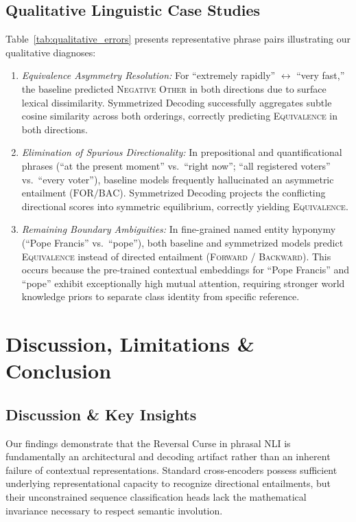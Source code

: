 \documentclass[11pt,a4paper,twocolumn]{article}
\begin{document}
\subsection{Qualitative Linguistic Case Studies}
Table~\ref{tab:qualitative_errors} presents representative phrase pairs illustrating our qualitative diagnoses:
\begin{enumerate}
    \item \textit{Equivalence Asymmetry Resolution:} For ``extremely rapidly'' $\leftrightarrow$ ``very fast,'' the baseline predicted \textsc{Negative Other} in both directions due to surface lexical dissimilarity. Symmetrized Decoding successfully aggregates subtle cosine similarity across both orderings, correctly predicting \textsc{Equivalence} in both directions.
    \item \textit{Elimination of Spurious Directionality:} In prepositional and quantificational phrases (``at the present moment'' vs.\ ``right now''; ``all registered voters'' vs.\ ``every voter''), baseline models frequently hallucinated an asymmetric entailment ($\text{FOR} / \text{BAC}$). Symmetrized Decoding projects the conflicting directional scores into symmetric equilibrium, correctly yielding \textsc{Equivalence}.
    \item \textit{Remaining Boundary Ambiguities:} In fine-grained named entity hyponymy (``Pope Francis'' vs.\ ``pope''), both baseline and symmetrized models predict \textsc{Equivalence} instead of directed entailment (\textsc{Forward} / \textsc{Backward}). This occurs because the pre-trained contextual embeddings for ``Pope Francis'' and ``pope'' exhibit exceptionally high mutual attention, requiring stronger world knowledge priors to separate class identity from specific reference.
\end{enumerate}

\section{Discussion, Limitations \& Conclusion}
\label{sec:conclusion}

\subsection{Discussion \& Key Insights}
Our findings demonstrate that the Reversal Curse in phrasal NLI is fundamentally an architectural and decoding artifact rather than an inherent failure of contextual representations. Standard cross-encoders possess sufficient underlying representational capacity to recognize directional entailments, but their unconstrained sequence classification heads lack the mathematical invariance necessary to respect semantic involution.
\end{document}
